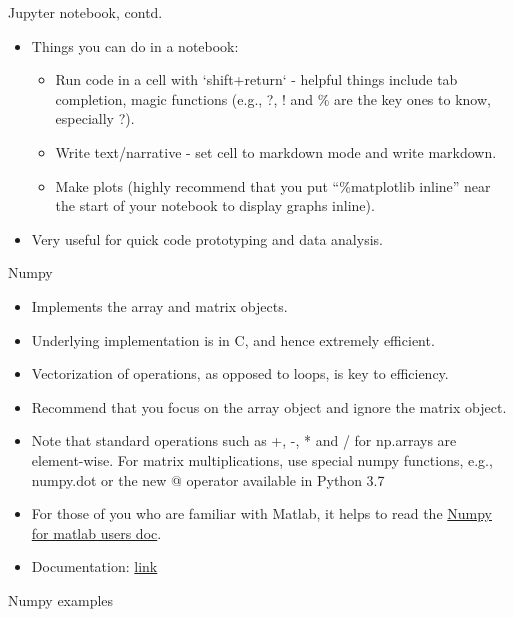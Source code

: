 \documentclass[aspectratio=169]{beamer}
\begin{document}
\begin{frame}{Jupyter notebook, contd.}
    \begin{itemize}
        \item Things you can do in a notebook:
        \begin{itemize}
            \item Run code in a cell with `shift+return` - helpful things include tab completion, magic functions (e.g., ?, ! and \% are the key ones to know, especially ?).
            \item Write text/narrative - set cell to markdown mode and write markdown.
            \item Make plots (highly recommend that you put ``\%matplotlib inline'' near the start of your notebook to display graphs inline).
        \end{itemize}
        \item Very useful for quick code prototyping and data analysis.
    \end{itemize}
\end{frame}


\begin{frame}{Numpy}
    \begin{itemize}
        \item Implements the array and matrix objects.
        \item Underlying implementation is in C, and hence extremely efficient.
        \item Vectorization of operations, as opposed to loops, is key to efficiency.
        \item Recommend that you focus on the array object and ignore the matrix object.
        \item Note that standard operations such as +, -, * and / for np.arrays are element-wise. For matrix multiplications, use special numpy functions, e.g., numpy.dot or the new @ operator available in Python 3.7
        \item For those of you who are familiar with Matlab, it helps to read the \href{https://docs.scipy.org/doc/numpy/user/numpy-for-matlab-users.html}{Numpy for matlab users doc}.
        \item Documentation: \href{http://docs.scipy.org/doc/numpy/}{link}
    \end{itemize}
\end{frame}


\begin{frame}[fragile]{Numpy examples}
    \inputminted{python}{example_numpy.py}
\end{frame}
\end{document}
